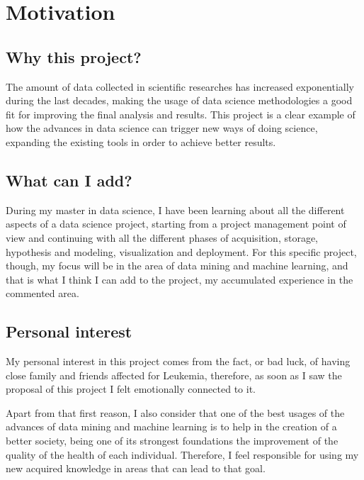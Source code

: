 

\section{Motivation}

\subsection{Why this project?}
The amount of data collected in scientific researches has increased exponentially during the last decades, making the usage of data science methodologies a good fit for improving the final analysis and results.
This project is a clear example of how the advances in data science can trigger new ways of doing science, expanding the existing tools in order to achieve better results.

\subsection{What can I add?}
During my master in data science, I have been learning about all the different aspects of a data science project, starting from a project management point of view and continuing with all the different phases of acquisition, storage, hypothesis and modeling, visualization and deployment.
For this specific project, though, my focus will be in the area of data mining and machine learning, and that is what I think I can add to the project, my accumulated experience in the commented area.

\subsection{Personal interest}
My personal interest in this project comes from the fact, or bad luck, of having close family and friends affected for Leukemia, therefore, as soon as I saw the proposal of this project I felt emotionally connected to it.

Apart from that first reason, I also consider that one of the best usages of the advances of data mining and machine learning is to help in the creation of a better society, being one of its strongest foundations the improvement of the quality of the health of each individual. Therefore, I feel responsible for using my new acquired knowledge in areas that can lead to that goal.

